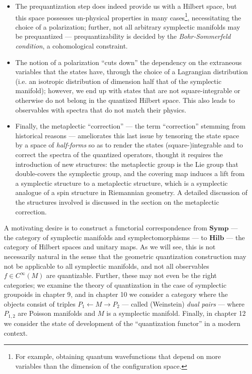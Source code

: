 \documentclass{tufte-handout}
\begin{document}
\begin{itemize}
\item The prequantization step does indeed provide us with a Hilbert space, but this space possesses un-physical properties in many cases\footnote{For example, obtaining quantum wavefunctions that depend on more variables than the dimension of the configuration space.}, necessitating the choice of a polarization; further, not all arbitrary symplectic manifolds may be prequantized --- prequantizability is decided by the \emph{Bohr-Sommerfeld condition}, a cohomological constraint.

\item The notion of a polarization ``cuts down'' the dependency on the extraneous variables that the states have, through the choice of a Lagrangian distribution (i.e. an isotropic distribution of dimension half that of the symplectic manifold); however, we end up with states that are not square-integrable or otherwise do not belong in the quantized Hilbert space. This also leads to observables with spectra that do not match their physics.

\item Finally, the metaplectic ``correction'' --- the term ``correction'' stemming from historical reasons --- ameliorates this last issue by tensoring the state space by a space of \emph{half-forms} so as to render the states (square-)integrable and to correct the spectra of the quantized operators, thought it requires the introduction of new structures: the metaplectic group is the Lie group that double-covers the symplectic group, and the covering map induces a lift from a symplectic structure to a metaplectic structure, which is a symplectic analogue of a spin structure in Riemannian geometry. A detailed discussion of the structures involved is discussed in the section on the metaplectic correction.
\end{itemize}

A motivating desire is to construct a functorial correspondence from $\mathbf{Symp}$ --- the category of symplectic manifolds and symplectomorphisms --- to $\mathbf{Hilb}$ --- the category of Hilbert spaces and unitary maps. As we will see, this is not necessarily natural in the sense that the geometric quantization construction may not be applicable to all symplectic manifolds, and not all observables $f \in C^\infty(M)$ are quantizable. Further, these may not even be the right categories; we examine the theory of quantization in the case of symplectic groupoids in chapter 9, and in chapter 10 we consider a category where the objects consist of triples $P_1 \leftarrow M \to P_2$ --- called (Weinstein) \emph{dual pairs} --- where $P_{1,2}$ are Poisson manifolds and $M$ is a symplectic manifold. Finally, in chapter 12 we consider the state of development of the ``quantization functor'' in a modern context.
\end{document}
